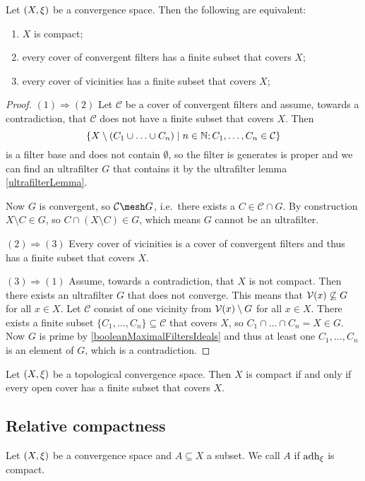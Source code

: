 \begin{proposition}
Let $\left( X,\xi \right)$ be a convergence space. Then the following are equivalent:
\begin{enumerate}
\item $X$ is compact;
\item every cover of convergent filters has a finite subset that covers $X$;
\item every cover of vicinities has a finite subset that covers $X$;
\end{enumerate}
\end{proposition}
\begin{proof}
$(1) \Rightarrow (2)$ Let $\mathcal{C}$ be a cover of convergent filters and assume, towards a contradiction, that $\mathcal{C}$ does not have a finite subset that covers $X$. Then
\[ \left\{ X\setminus(C_1\cup \ldots \cup C_n) \;\middle|\; n\in \mathbb{N}; C_1,\ldots, C_n \in \mathcal{C} \right\} \]
is a filter base and does not contain $\emptyset$, so the filter is generates is proper and we can find an ultrafilter $G$ that contains it by the ultrafilter lemma \ref{ultrafilterLemma}.

Now $G$ is convergent, so $\mathcal{C}\mesh G$, i.e.\ there exists a $C\in \mathcal{C}\cap G$. By construction $X\setminus C\in G$, so $C\cap (X\setminus C)\in G$, which means $G$ cannot be an ultrafilter.

$(2) \Rightarrow (3)$ Every cover of vicinities is a cover of convergent filters and thus has a finite subset that covers $X$.

$(3) \Rightarrow (1)$ Assume, towards a contradiction, that $X$ is not compact. Then there exists an ultrafilter $G$ that does not converge. This means that $\operatorname{\mathcal{V}}(x) \not\subseteq G$ for all $x\in X$. Let $\mathcal{C}$ consist of one vicinity from $\operatorname{\mathcal{V}}(x)\setminus G$ for all $x\in X$. There exists a finite subset $\{C_1, \ldots, C_n\}\subseteq \mathcal{C}$ that covers $X$, so $C_1\cap \ldots \cap C_n = X \in G$. Now $G$ is prime by \ref{booleanMaximalFiltersIdeals} and thus at least one $C_1, \ldots, C_n$ is an element of $G$, which is a contradiction.
\end{proof}
\begin{corollary} \label{topologyCompactnessOpenCover}
Let $\left( X,\xi \right)$ be a topological convergence space. Then $X$ is compact \textup{if and only if} every open cover has a finite subset that covers $X$.
\end{corollary}

\subsection{Relative compactness}
\begin{definition}
Let $\left( X,\xi \right)$ be a convergence space and $A\subseteq X$ a subset. We call $A$  if $\operatorname{adh}_\xi$ is compact.
\end{definition}

